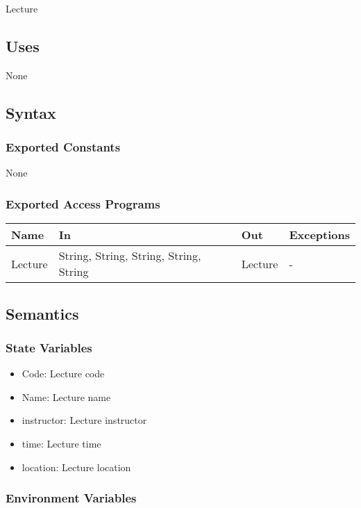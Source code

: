 \documentclass[12pt, titlepage]{article}
\begin{document}
Lecture

\subsection{Uses}

None

\subsection{Syntax}

\subsubsection{Exported Constants}
None

\subsubsection{Exported Access Programs}
\begin{center}
\begin{tabular}{p{4cm} p{2cm} p{4cm} p{4cm}}
\hline
\textbf{Name} & \textbf{In} & \textbf{Out} & \textbf{Exceptions} \\
\hline
Lecture & String, String, String, String, String & Lecture & -\\
\hline
\end{tabular}
\end{center}

\subsection{Semantics}

\subsubsection{State Variables}

\begin{itemize}
\item Code: Lecture code
\item Name: Lecture name
\item instructor: Lecture instructor
\item time: Lecture time
\item location: Lecture location
\end{itemize}

\subsubsection{Environment Variables}
\end{document}
